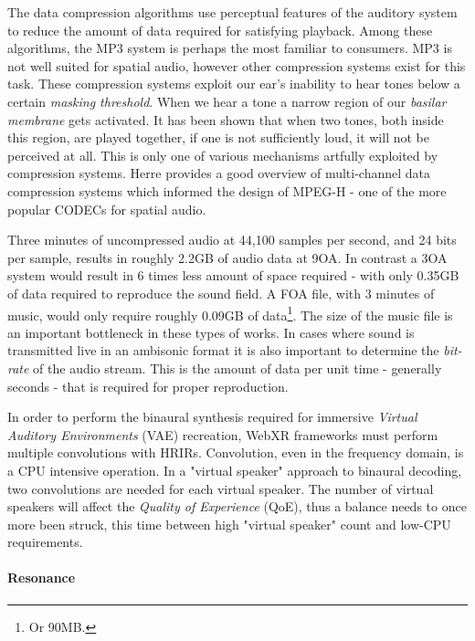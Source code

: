 The data compression algorithms use perceptual features of the auditory system to reduce the amount of data required for satisfying playback. Among these algorithms, the MP3 system is perhaps the most familiar to consumers. MP3 is not well suited for spatial audio, however other compression systems exist for this task. These compression systems exploit our ear's inability to hear tones below a certain \textit{masking threshold}. When we hear a tone a narrow region of our \textit{basilar membrane} gets activated. It has been shown that when two tones, both inside this region, are played together, if one is not sufficiently loud, it will not be perceived at all. This is only one of various mechanisms artfully exploited by compression systems. Herre \cite{herre2015mpeg} provides a good overview of multi-channel data compression systems which informed the design of MPEG-H - one of the more popular CODECs for spatial audio.

Three minutes of uncompressed audio at 44,100 samples per second, and 24 bits per sample, results in roughly 2.2GB of audio data at 9OA. In contrast a 3OA system would result in 6 times less amount of space required - with only 0.35GB of data required to reproduce the sound field. A FOA file, with 3 minutes of music, would only require roughly 0.09GB of data\footnote{Or 90MB.}. The size of the music file is an important bottleneck in these types of works. In cases where sound is transmitted live in an ambisonic format it is also important to determine the \textit{bit-rate} of the audio stream. This is the amount of data per unit time - generally seconds - that is required for proper reproduction. 

In order to perform the binaural synthesis required for immersive \textit{Virtual Auditory Environments} (VAE) recreation, WebXR frameworks must perform multiple convolutions with HRIRs. Convolution, even in the frequency domain, is a CPU intensive operation. In a "virtual speaker" approach to binaural decoding, two convolutions are needed for each virtual speaker. The number of virtual speakers will affect the \textit{Quality of Experience} (QoE), thus a balance needs to once more been struck, this time between high "virtual speaker" count and low-CPU requirements. 

\paragraph{Resonance}

